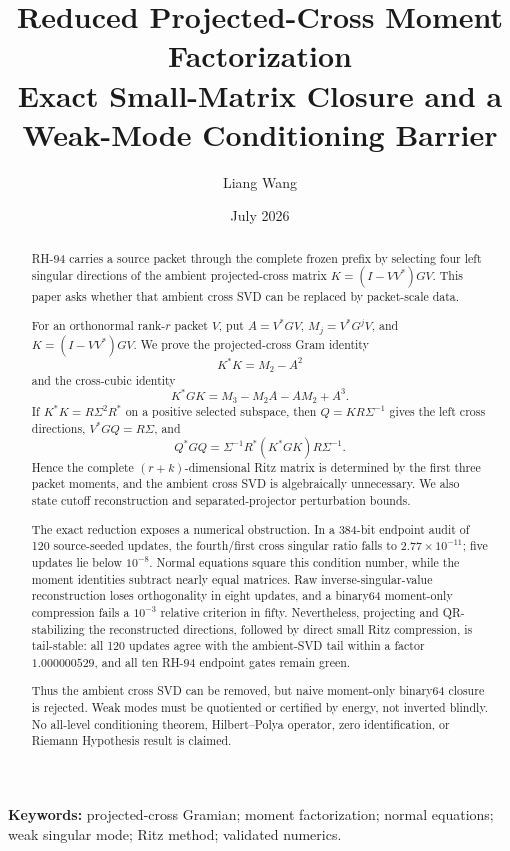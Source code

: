 \documentclass[11pt]{article}
\title{Reduced Projected-Cross Moment Factorization\\
\large Exact Small-Matrix Closure and a Weak-Mode Conditioning Barrier}
\author{Liang Wang}
\date{July 2026}
\theoremstyle{definition}
\theoremstyle{remark}
\begin{document}
\maketitle

\begin{abstract}
RH-94 carries a source packet through the complete frozen prefix by selecting
four left singular directions of the ambient projected-cross matrix
$K=(I-VV^*)GV$.  This paper asks whether that ambient cross SVD can be
replaced by packet-scale data.

For an orthonormal rank-$r$ packet $V$, put
$A=V^*GV$, $M_j=V^*G^jV$, and $K=(I-VV^*)GV$.  We prove the
projected-cross Gram identity
\[
 K^*K=M_2-A^2
\]
and the cross-cubic identity
\[
 K^*GK=M_3-M_2A-AM_2+A^3.
\]
If $K^*K=R\Sigma^2R^*$ on a positive selected subspace, then
$Q=KR\Sigma^{-1}$ gives the left cross directions,
$V^*GQ=R\Sigma$, and
\[
 Q^*GQ=\Sigma^{-1}R^*(K^*GK)R\Sigma^{-1}.
\]
Hence the complete $(r+k)$-dimensional Ritz matrix is determined by the first
three packet moments, and the ambient cross SVD is algebraically unnecessary.
We also state cutoff reconstruction and separated-projector perturbation
bounds.

The exact reduction exposes a numerical obstruction.  In a 384-bit endpoint
audit of 120 source-seeded updates, the fourth/first cross singular ratio
falls to $2.77\times10^{-11}$; five updates lie below $10^{-8}$.  Normal
equations square this condition number, while the moment identities subtract
nearly equal matrices.  Raw inverse-singular-value reconstruction loses
orthogonality in eight updates, and a binary64 moment-only compression fails a
$10^{-3}$ relative criterion in fifty.  Nevertheless, projecting and
QR-stabilizing the reconstructed directions, followed by direct small Ritz
compression, is tail-stable: all 120 updates agree with the ambient-SVD tail
within a factor $1.000000529$, and all ten RH-94 endpoint gates remain green.

Thus the ambient cross SVD can be removed, but naive moment-only binary64
closure is rejected.  Weak modes must be quotiented or certified by energy,
not inverted blindly.  No all-level conditioning theorem, Hilbert--Polya
operator, zero identification, or Riemann Hypothesis result is claimed.
\end{abstract}

\noindent\textbf{Keywords:} projected-cross Gramian; moment factorization;
normal equations; weak singular mode; Ritz method; validated numerics.
\end{document}
